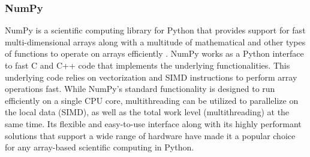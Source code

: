 \subsubsection{NumPy} \label{background:implementation_tools_and_libraries:numpy}
NumPy is a scientific computing library for Python that provides support for fast multi-dimensional arrays along with a multitude of mathematical and other types of functions to operate on arrays efficiently \cite{numpy}.
NumPy works as a Python interface to fast C and C++ code that implements the underlying functionalities.
This underlying code relies on vectorization and SIMD instructions to perform array operations fast. 
While NumPy's standard functionality is designed to run efficiently on a single CPU core, multithreading can be utilized to parallelize on the local data (SIMD), as well as the total work level (multithreading) at the same time.
Its flexible and easy-to-use interface along with its highly performant solutions that support a wide range of hardware have made it a popular choice for any array-based scientific computing in Python.

